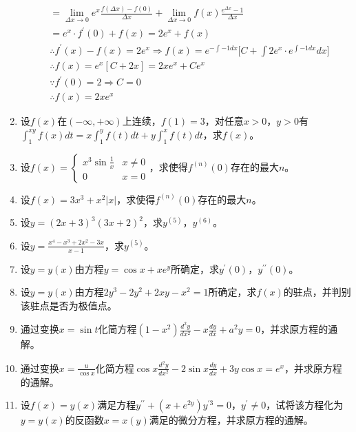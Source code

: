 \begin{enumerate}[{例}1.]
\begin{align*}
                &=\lim_{\Delta x\to 0}e^x\frac{f(\Delta x)-f(0)}{\Delta x}+\lim_{\Delta x\to 0}f(x)\frac{e^{\Delta x}-1}{\Delta x}\\
                &=e^x\cdot f^{\prime}(0)+f(x)=2e^x+f(x)\\
                &\therefore f^{\prime}(x)-f(x)=2e^x\Rightarrow f(x)=e^{-\int -1dx}\Big[C+\int2e^x\cdot e^{\int -1dx}dx\Big]\\
                &\therefore f(x)=e^x[C+2x]=2xe^x+Ce^x\\
                &\because f^{\prime}(0)=2\Rightarrow C=0\\
                &\therefore f(x)=2xe^x
        \end{align*}
    \item 设$f(x)$在$(-\infty,+\infty)$上连续，$f(1)=3$，对任意$x>0$，$y>0$有$\int_1^{xy}f(x)dt=x\int_1^y f(t)dt+y\int_1^x f(t)dt$，求$f(x)$。
    \item 设$f(x)=\begin{cases}x^3 \sin \frac{1}{x} & x\neq 0\\
                                0 & x=0
                \end{cases}$，求使得$f^{(n)}(0)$存在的最大$n$。
    \item 设$f(x)=3x^3 + x^2 \left|x\right|$，求使得$f^{(n)}(0)$存在的最大$n$。
    \item 设$y=(2x+3)^3(3x+2)^2$，求$y^{(5)}$，$y^{(6)}$。
    \item 设$y=\frac{x^4-x^3+2x^2-3x}{x-1}$，求$y^{(5)}$。
    \item 设$y=y(x)$由方程$y=\cos x +xe^y$所确定，求$y^{\prime}(0)$，$y^{\prime\prime}(0)$。
    \item 设$y=y(x)$由方程$2y^3-2y^2+2xy-x^2 =1$所确定，求$f(x)$的驻点，并判别该驻点是否为极值点。
    \item 通过变换$x=\sin t$化简方程$(1-x^2)\frac{d^2y}{dx^2}-x\frac{dy}{dx}+a^2 y=0$，并求原方程的通解。
    \item 通过变换$x=\frac{u}{\cos x}$化简方程$\cos x \frac{d^2 y}{d x^2}-2\sin x \frac{dy}{dx}+3y \cos x=e^x$，并求原方程的通解。
    \item 设$f(x)=y(x)$满足方程$y^{\prime\prime}+(x+e^{2y})y^{\prime 3}=0$，$y^{\prime}\neq 0$，试将该方程化为$y=y(x)$的反函数$x=x(y)$满足的微分方程，并求原方程的通解。
\end{enumerate}
